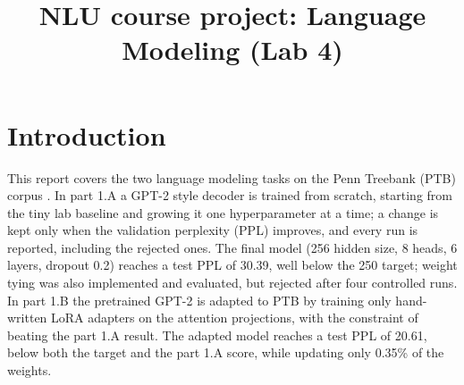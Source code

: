 \documentclass[a4paper]{article}
\title{NLU course project: Language Modeling (Lab 4)}
\begin{document}
\maketitle

\section{Introduction}
This report covers the two language modeling tasks on the Penn Treebank (PTB) corpus \cite{marcus1993ptb}. In part 1.A a GPT-2 style decoder \cite{radford2019gpt2} is trained from scratch, starting from the tiny lab baseline and growing it one hyperparameter at a time; a change is kept only when the validation perplexity (PPL) improves, and every run is reported, including the rejected ones. The final model (256 hidden size, 8 heads, 6 layers, dropout 0.2) reaches a test PPL of 30.39, well below the 250 target; weight tying was also implemented and evaluated, but rejected after four controlled runs. In part 1.B the pretrained GPT-2 is adapted to PTB by training only hand-written LoRA adapters \cite{hu2022lora} on the attention projections, with the constraint of beating the part 1.A result. The adapted model reaches a test PPL of 20.61, below both the target and the part 1.A score, while updating only 0.35\% of the weights.
\end{document}
